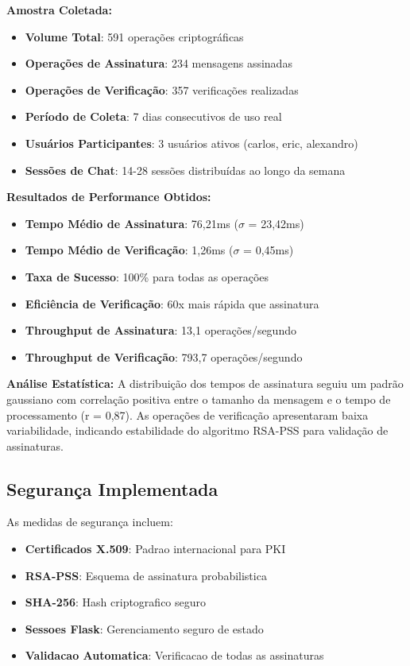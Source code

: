 \documentclass[12pt,a4paper,oneside]{article}
\begin{document}
\textbf{Amostra Coletada:}
\begin{itemize}
    \item \textbf{Volume Total}: 591 operações criptográficas
    \item \textbf{Operações de Assinatura}: 234 mensagens assinadas
    \item \textbf{Operações de Verificação}: 357 verificações realizadas
    \item \textbf{Período de Coleta}: 7 dias consecutivos de uso real
    \item \textbf{Usuários Participantes}: 3 usuários ativos (carlos, eric, alexandro)
    \item \textbf{Sessões de Chat}: 14-28 sessões distribuídas ao longo da semana
\end{itemize}

\textbf{Resultados de Performance Obtidos:}
\begin{itemize}
    \item \textbf{Tempo Médio de Assinatura}: 76,21ms ($\sigma$ = 23,42ms)
    \item \textbf{Tempo Médio de Verificação}: 1,26ms ($\sigma$ = 0,45ms)
    \item \textbf{Taxa de Sucesso}: 100\% para todas as operações
    \item \textbf{Eficiência de Verificação}: 60x mais rápida que assinatura
    \item \textbf{Throughput de Assinatura}: 13,1 operações/segundo
    \item \textbf{Throughput de Verificação}: 793,7 operações/segundo
\end{itemize}

\textbf{Análise Estatística:}
A distribuição dos tempos de assinatura seguiu um padrão gaussiano com correlação positiva entre o tamanho da mensagem e o tempo de processamento (r = 0,87). As operações de verificação apresentaram baixa variabilidade, indicando estabilidade do algoritmo RSA-PSS para validação de assinaturas.

\subsection{Segurança Implementada}

As medidas de segurança incluem:

\begin{itemize}
    \item \textbf{Certificados X.509}: Padrao internacional para PKI
    \item \textbf{RSA-PSS}: Esquema de assinatura probabilistica
    \item \textbf{SHA-256}: Hash criptografico seguro
    \item \textbf{Sessoes Flask}: Gerenciamento seguro de estado
    \item \textbf{Validacao Automatica}: Verificacao de todas as assinaturas
\end{itemize}
\end{document}
